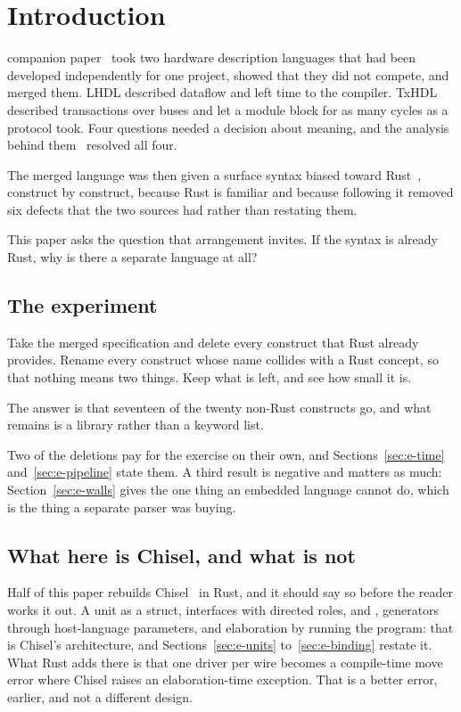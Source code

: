 \section{Introduction}
\label{sec:e-intro}

 companion paper~\cite{merge} took two hardware
description languages that had been developed independently for one
project, showed that they did not compete, and merged them. LHDL described
dataflow and left time to the compiler. TxHDL described transactions over
buses and let a module block for as many cycles as a protocol took. Four
questions needed a decision about meaning, and the analysis behind
them~\cite{unification} resolved all four.

The merged language was then given a surface syntax biased toward
Rust~\cite{syntax}, construct by construct, because Rust is familiar and
because following it removed six defects that the two sources had rather
than restating them.

This paper asks the question that arrangement invites. If the syntax is
already Rust, why is there a separate language at all?

\subsection{The experiment}

Take the merged specification and delete every construct that Rust already
provides. Rename every construct whose name collides with a Rust concept,
so that nothing means two things. Keep what is left, and see how small it
is.

The answer is that seventeen of the twenty non-Rust constructs go, and what
remains is a library rather than a keyword list.

Two of the deletions pay for the exercise on their own, and
Sections~\ref{sec:e-time} and~\ref{sec:e-pipeline} state them. A third
result is negative and matters as much: Section~\ref{sec:e-walls} gives the
one thing an embedded language cannot do, which is the thing a separate
parser was buying.

\subsection{What here is Chisel, and what is not}

Half of this paper rebuilds Chisel~\cite{bachrach2012} in Rust, and it
should say so before the reader works it out. A unit as a struct,
interfaces with directed roles,  and , generators
through host-language parameters, and elaboration by running the program:
that is Chisel's architecture, and Sections~\ref{sec:e-units}
to~\ref{sec:e-binding} restate it. What Rust adds there is that one
driver per wire becomes a compile-time move error where Chisel raises an
elaboration-time exception. That is a better error, earlier, and not a
different design.

